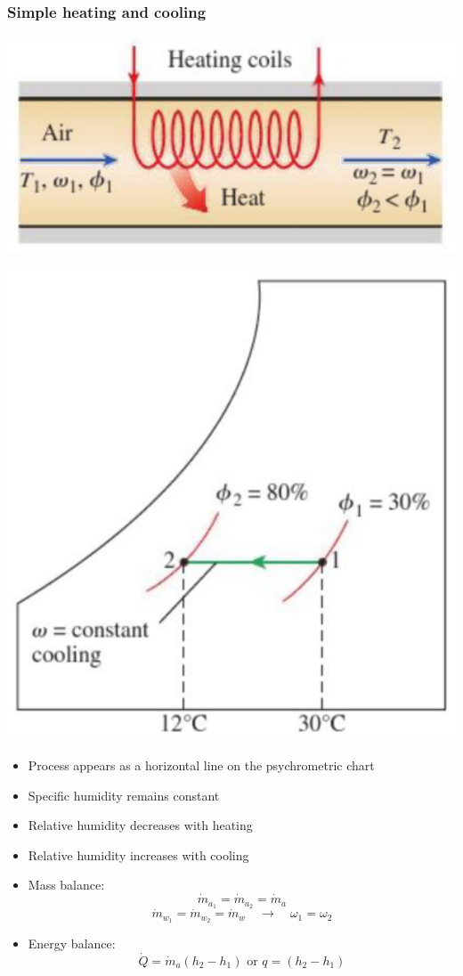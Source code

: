 \documentclass[11pt]{article}
\begin{document}
\subsubsection{Simple heating and cooling}
\label{sec:org4e70ba8}
\begin{center}
\includegraphics[scale=0.6]{./images/simple-heating-and-cooling-diagram.png}
\end{center}

\begin{center}
\includegraphics[scale=0.7]{./images/simple-heating-and-cooling-psychrometric-chart.png}
\end{center}
\begin{itemize}
\item Process appears as a horizontal line on the psychrometric chart
\item Specific humidity remains constant
\item Relative humidity decreases with heating
\item Relative humidity increases with cooling
\item Mass balance:
\[\dot{m}_{a_1} = \dot{m}_{a_2} = \dot{m}_a\]
\[\dot{m}_{w_1} = \dot{m}_{w_2} = \dot{m}_w \quad \rightarrow \quad \omega_1 = \omega_2\]
\item Energy balance:
\[\dot{Q} = \dot{m}_a (h_2 - h_1) \text{ or } q = (h_2 - h_1)\]
\end{itemize}
\end{document}
